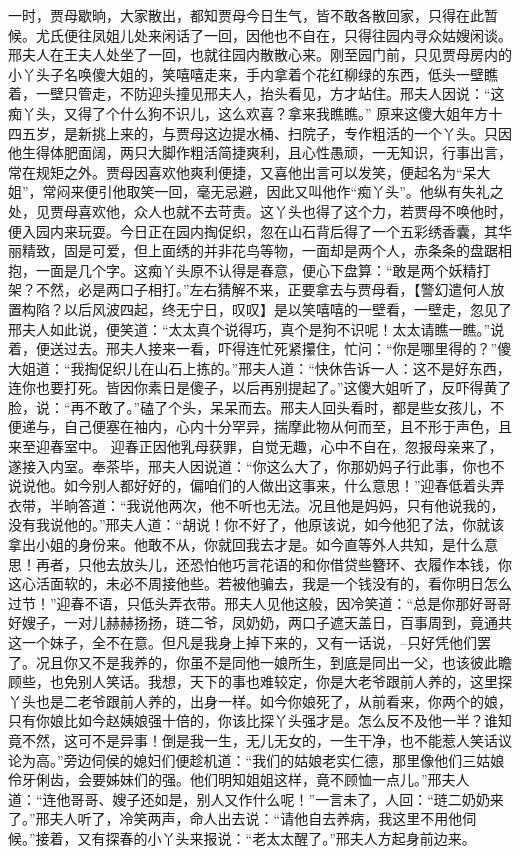 \documentclass[12pt,oneside]{book}
\begin{document}
一时，贾母歇晌，大家散出，都知贾母今日生气，皆不敢各散回家，只得在此暂候。尤氏便往凤姐儿处来闲话了一回，因他也不自在，只得往园内寻众姑嫂闲谈。邢夫人在王夫人处坐了一回，也就往园内散散心来。刚至园门前，只见贾母房内的小丫头子名唤傻大姐的，笑嘻嘻走来，手内拿着个花红柳绿的东西，低头一壁瞧着，一壁只管走，不防迎头撞见邢夫人，抬头看见，方才站住。邢夫人因说：“这痴丫头，又得了个什么狗不识儿，这么欢喜？拿来我瞧瞧。”
原来这傻大姐年方十四五岁，是新挑上来的，与贾母这边提水桶、扫院子，专作粗活的一个丫头。只因他生得体肥面阔，两只大脚作粗活简捷爽利，且心性愚顽，一无知识，行事出言，常在规矩之外。贾母因喜欢他爽利便捷，又喜他出言可以发笑，便起名为“呆大姐”，常闷来便引他取笑一回，毫无忌避，因此又叫他作“痴丫头”。他纵有失礼之处，见贾母喜欢他，众人也就不去苛责。这丫头也得了这个力，若贾母不唤他时，便入园内来玩耍。今日正在园内掏促织，忽在山石背后得了一个五彩绣香囊，其华丽精致，固是可爱，但上面绣的并非花鸟等物，一面却是两个人，赤条条的盘踞相抱，一面是几个字。这痴丫头原不认得是春意，便心下盘算：“敢是两个妖精打架？不然，必是两口子相打。”左右猜解不来，正要拿去与贾母看，【警幻遣何人放置构陷？以后风波四起，终无宁日，叹叹】是以笑嘻嘻的一壁看，一壁走，忽见了邢夫人如此说，便笑道：“太太真个说得巧，真个是狗不识呢！太太请瞧一瞧。”说着，便送过去。邢夫人接来一看，吓得连忙死紧攥住，忙问：“你是哪里得的？”傻大姐道：“我掏促织儿在山石上拣的。”邢夫人道：“快休告诉一人：这不是好东西，连你也要打死。皆因你素日是傻子，以后再别提起了。”这傻大姐听了，反吓得黄了脸，说：“再不敢了。”磕了个头，呆呆而去。邢夫人回头看时，都是些女孩儿，不便递与，自己便塞在袖内，心内十分罕异，揣摩此物从何而至，且不形于声色，且来至迎春室中。
迎春正因他乳母获罪，自觉无趣，心中不自在，忽报母亲来了，遂接入内室。奉茶毕，邢夫人因说道：“你这么大了，你那奶妈子行此事，你也不说说他。如今别人都好好的，偏咱们的人做出这事来，什么意思！”迎春低着头弄衣带，半晌答道：“我说他两次，他不听也无法。况且他是妈妈，只有他说我的，没有我说他的。”邢夫人道：“胡说！你不好了，他原该说，如今他犯了法，你就该拿出小姐的身份来。他敢不从，你就回我去才是。如今直等外人共知，是什么意思！再者，只他去放头儿，还恐怕他巧言花语的和你借贷些簪环、衣履作本钱，你这心活面软的，未必不周接他些。若被他骗去，我是一个钱没有的，看你明日怎么过节！”迎春不语，只低头弄衣带。邢夫人见他这般，因冷笑道：“总是你那好哥哥好嫂子，一对儿赫赫扬扬，琏二爷，凤奶奶，两口子遮天盖日，百事周到，竟通共这一个妹子，全不在意。但凡是我身上掉下来的，又有一话说，--只好凭他们罢了。况且你又不是我养的，你虽不是同他一娘所生，到底是同出一父，也该彼此瞻顾些，也免别人笑话。我想，天下的事也难较定，你是大老爷跟前人养的，这里探丫头也是二老爷跟前人养的，出身一样。如今你娘死了，从前看来，你两个的娘，只有你娘比如今赵姨娘强十倍的，你该比探丫头强才是。怎么反不及他一半？谁知竟不然，这可不是异事！倒是我一生，无儿无女的，一生干净，也不能惹人笑话议论为高。”旁边伺侯的媳妇们便趁机道：“我们的姑娘老实仁德，那里像他们三姑娘伶牙俐齿，会要姊妹们的强。他们明知姐姐这样，竟不顾恤一点儿。”邢夫人道：“连他哥哥、嫂子还如是，别人又作什么呢！”一言未了，人回：“琏二奶奶来了。”邢夫人听了，冷笑两声，命人出去说：“请他自去养病，我这里不用他伺候。”接着，又有探春的小丫头来报说：“老太太醒了。”邢夫人方起身前边来。
\end{document}
